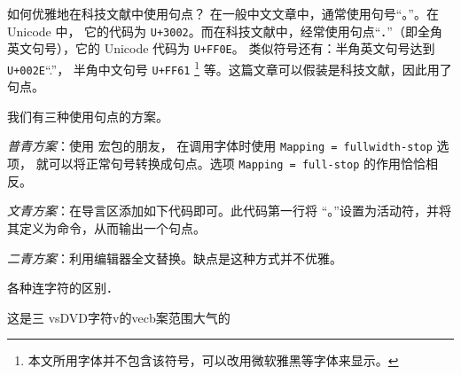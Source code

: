 \begin{myQA}{如何优雅地在科技文献中使用句点？}
	在一般中文文章中，通常使用句号“{。}”。在 Unicode 中，
	它的代码为 \verb|U+3002|。而在科技文献中，经常使用句点“．”（即全角
	英文句号），它的 Unicode 代码为 \verb|U+FF0E|。
	类似符号还有：半角英文句号达到 \verb|U+002E|“.”，
	半角中文句号 \verb|U+FF61|
	\footnote{本文所用字体并不包含该符号，可以改用微软雅黑等字体来显示。}
	等。这篇文章可以假装是科技文献，因此用了句点。
	
	我们有三种使用句点的方案。
	
	\emph{普青方案}：使用   宏包的朋友，
	在调用字体时使用
	\verb|Mapping = fullwidth-stop|  选项，
	就可以将正常句号转换成句点。选项 \verb|Mapping = full-stop|
	的作用恰恰相反。
	
	\emph{文青方案}：在导言区添加如下代码即可。此代码第一行将
	“{。}”设置为活动符，并将其定义为命令，从而输出一个句点。
	 
	
	\emph{二青方案}：利用编辑器全文替换。缺点是这种方式并不优雅。
	
\end{myQA}

\begin{myQA}{各种连字符的区别．}
	
\end{myQA}

\begin{myQA}{这是三}
	vsDVD字符v的vecb案范围大气的
\end{myQA}